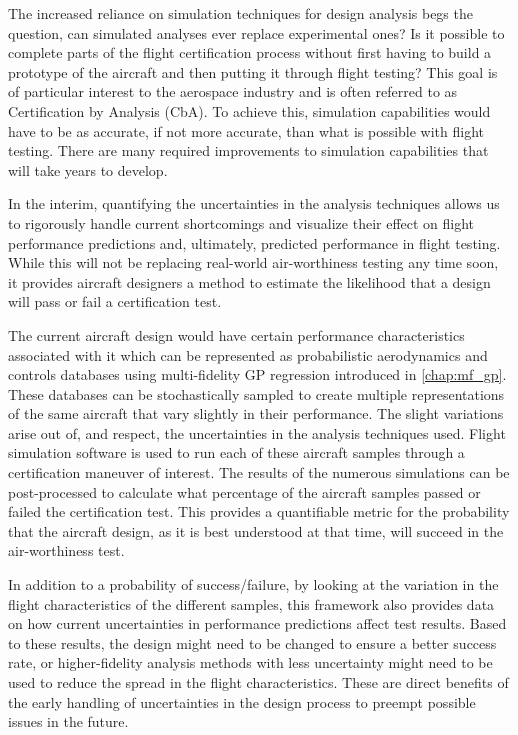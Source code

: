 The increased reliance on simulation techniques for design analysis begs the question, can simulated analyses ever replace experimental ones?
Is it possible to complete parts of the flight certification process without first having to build a prototype of the aircraft and then putting it through flight testing?
This goal is of particular interest to the aerospace industry and is often referred to as Certification by Analysis (CbA).
To achieve this, simulation capabilities would have to be as accurate, if not more accurate, than what is possible with flight testing.  
There are many required improvements to simulation capabilities \cite{slotnick_cfd_nodate} that will take years to develop.

In the interim, quantifying the uncertainties in the analysis techniques allows us to rigorously handle current shortcomings and visualize their effect on flight performance predictions and, ultimately, predicted performance in flight testing.
While this will not be replacing real-world air-worthiness testing any time soon, it provides aircraft designers a method to estimate the likelihood that a design will pass or fail a certification test. 

The current aircraft design would have certain performance characteristics associated with it which can be represented as probabilistic aerodynamics and controls databases using multi-fidelity GP regression introduced in \ref{chap:mf_gp}.
These databases can be stochastically sampled to create multiple representations of the same aircraft that vary slightly in their performance.
The slight variations arise out of, and respect, the uncertainties in the analysis techniques used. 
Flight simulation software is used to run each of these aircraft samples through a certification maneuver of interest.
The results of the numerous simulations can be post-processed to calculate what percentage of the aircraft samples passed or failed the certification test.
This provides a quantifiable metric for the probability that the aircraft design, as it is best understood at that time, will succeed in the air-worthiness test.

In addition to a probability of success/failure, by looking at the variation in the flight characteristics of the different samples, this framework also provides data on how current uncertainties in performance predictions affect test results.
Based to these results, the design might need to be changed to ensure a better success rate, or higher-fidelity analysis methods with less uncertainty might need to be used to reduce the spread in the flight characteristics. 
These are direct benefits of the early handling of uncertainties in the design process to preempt possible issues in the future. 


